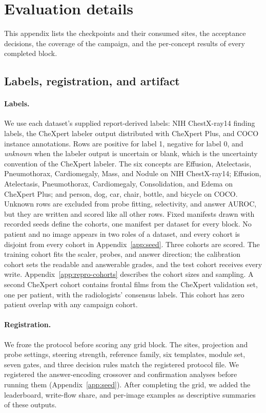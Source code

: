 \section{Evaluation details}
\label{app:campaign}

This appendix lists the checkpoints and their consumed sites, the acceptance decisions, the coverage of the campaign, and the per-concept results of every completed block.

\subsection{Labels, registration, and artifact}
\label{app:cf-labels}

\paragraph{Labels.} We use each dataset's supplied report-derived labels: NIH ChestX-ray14 finding labels\cite{wang2017chestxray}, the CheXpert labeler output\cite{irvin2019chexpert} distributed with CheXpert Plus\cite{chambon2024chexpertplus}, and COCO instance annotations\cite{lin2014coco}. Rows are positive for label 1, negative for label 0, and \emph{unknown} when the labeler output is uncertain or blank, which is the uncertainty convention of the CheXpert labeler\cite{irvin2019chexpert}. The six concepts are Effusion, Atelectasis, Pneumothorax, Cardiomegaly, Mass, and Nodule on NIH ChestX-ray14; Effusion, Atelectasis, Pneumothorax, Cardiomegaly, Consolidation, and Edema on CheXpert Plus; and person, dog, car, chair, bottle, and bicycle on COCO. Unknown rows are excluded from probe fitting, selectivity, and answer AUROC, but they are written and scored like all other rows. Fixed manifests drawn with recorded seeds define the cohorts, one manifest per dataset for every block. No patient and no image appears in two roles of a dataset, and every cohort is disjoint from every cohort in Appendix~\ref{app:seed}. Three cohorts are scored. The training cohort fits the scaler, probes, and answer direction; the calibration cohort sets the readable and answerable grades, and the test cohort receives every write. Appendix~\ref{app:repro-cohorts} describes the cohort sizes and sampling. A second CheXpert cohort contains \cfValidRows{} frontal films from the CheXpert validation set, one per patient, with the radiologists' consensus labels\cite{irvin2019chexpert}. This cohort has zero patient overlap with any campaign cohort.

\paragraph{Registration.} We froze the protocol before scoring any grid block. The sites, projection and probe settings, steering strength, reference family, six templates, module set, seven gates, and three decision rules match the registered protocol file. We registered the answer-encoding crossover and confirmation analyses before running them (Appendix~\ref{app:seed}). After completing the grid, we added the leaderboard, write-flow share, and per-image examples as descriptive summaries of these outputs.

